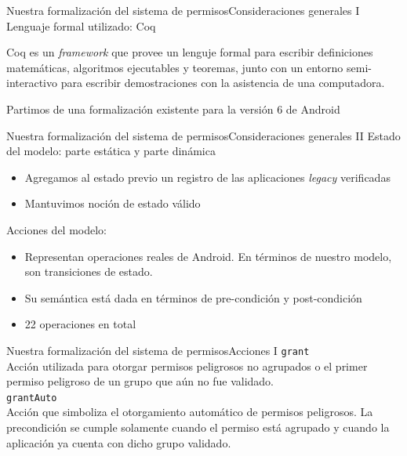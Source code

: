 \documentclass[pdf]{beamer} %
\begin{document}
\begin{frame}{Nuestra formalización del sistema de permisos}{Consideraciones generales I}
    Lenguaje formal utilizado: Coq
    \vspace{10px}
    \begin{block}{}
        Coq es un \textit{framework} que provee un lenguje formal para escribir definiciones
        matemáticas, algoritmos ejecutables y teoremas, junto con un entorno semi-interactivo para
        escribir demostraciones con la asistencia de una computadora.
    \end{block}
    \pause \vspace{20px}
    Partimos de una formalización existente para la versión 6 de Android
\end{frame}

\begin{frame}{Nuestra formalización del sistema de permisos}{Consideraciones generales II}
    Estado del modelo: parte estática y parte dinámica
    \begin{itemize}
        \item Agregamos al estado previo un registro de las aplicaciones \textit{legacy} verificadas
        \item Mantuvimos noción de estado válido
    \end{itemize}
    \pause \vspace{20px}
    Acciones del modelo:
    \begin{itemize}
        \item Representan operaciones reales de Android. En términos de nuestro modelo, son transiciones de estado.
        \item Su semántica está dada en términos de pre-condición y post-condición
        \item 22 operaciones en total
    \end{itemize}
\end{frame}

\begin{frame}{Nuestra formalización del sistema de permisos}{Acciones I}
    \texttt{grant}\\
    \vspace{5px}
    Acción utilizada para otorgar permisos peligrosos no agrupados o el primer permiso peligroso de
    un grupo que aún no fue validado.\\
    \pause
    \vspace{10px}
    \texttt{grantAuto}\\
    \vspace{5px}
    Acción que simboliza el otorgamiento automático de permisos peligrosos. La precondición se
    cumple solamente cuando el permiso está agrupado y cuando la aplicación ya cuenta con dicho
    grupo validado.
\end{frame}
\end{document}
